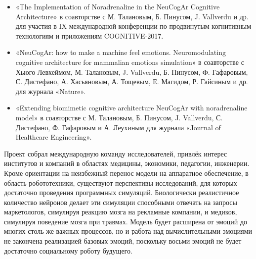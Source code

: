 \begin{itemize}
\item «The Implementation of Noradrenaline in the NeuCogAr Cognitive Architecture» в соавторстве с М. Талановым, Б. Пинусом, J. Vallverdu и др. для участия в IX международной конференции по продвинутым когнитивным технологиям и приложениям COGNITIVE-2017.
\item «NeuCogAr: how to make a machine feel emotions. Neuromodulating cognitive architecture for mammalian emotions simulation» в соавторстве с Хьюго Левхеймом, М. Талановым, J. Vallverdu, Б. Пинусом, Ф. Гафаровым, С. Дистефано, А. Хасьяновым, А. Тощевым, Е. Магидом, Р. Гайсиным и др. для журнала «Nature».
\item «Extending biomimetic cognitive architecture NeuCogAr with noradrenaline model» в соавторстве с М. Талановым, Б. Пинусом, J. Vallverdu, С. Дистефано, Ф. Гафаровым и А. Леухиным для журнала «Journal of Healthcare Engineering».
\end{itemize}


Проект собрал международную команду исследователей, привлёк интерес институтов и компаний в областях медицины, экономики, педагогии, инженерии. Кроме ориентации на неизбежный перенос модели на аппаратное обеспечение, в область робототехники, существуют перспективы исследований, для которых достаточно проведения программных симуляций. Биологически реалистичное количество нейронов делает эти симуляции способными отвечать на запросы маркетологов, симулируя реакцию мозга на рекламные компании, и медиков, симулируя поведение мозга при травмах. Модель будет расширена от эмоций до многих столь же важных процессов, но и работа над вычислительными эмоциями не закончена реализацией базовых эмоций, поскольку восьми эмоций не будет достаточно социальному роботу будущего.